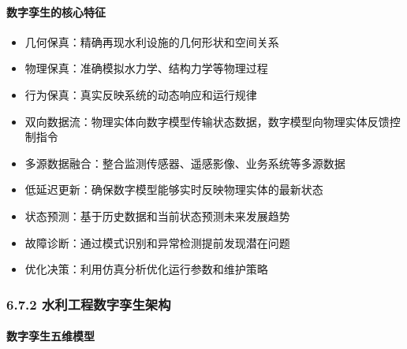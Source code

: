 \hypertarget{ux6570ux5b57ux5b6aux751fux7684ux6838ux5fc3ux7279ux5f81}{%
\paragraph{数字孪生的核心特征}\label{ux6570ux5b57ux5b6aux751fux7684ux6838ux5fc3ux7279ux5f81}}


\begin{itemize}
\tightlist
\item
  几何保真：精确再现水利设施的几何形状和空间关系
\item
  物理保真：准确模拟水力学、结构力学等物理过程
\item
  行为保真：真实反映系统的动态响应和运行规律
\end{itemize}


\begin{itemize}
\tightlist
\item
  双向数据流：物理实体向数字模型传输状态数据，数字模型向物理实体反馈控制指令
\item
  多源数据融合：整合监测传感器、遥感影像、业务系统等多源数据
\item
  低延迟更新：确保数字模型能够实时反映物理实体的最新状态
\end{itemize}


\begin{itemize}
\tightlist
\item
  状态预测：基于历史数据和当前状态预测未来发展趋势
\item
  故障诊断：通过模式识别和异常检测提前发现潜在问题
\item
  优化决策：利用仿真分析优化运行参数和维护策略
\end{itemize}

\hypertarget{ux6c34ux5229ux5de5ux7a0bux6570ux5b57ux5b6aux751fux67b6ux6784}{%
\subsubsection{6.7.2 水利工程数字孪生架构}\label{ux6c34ux5229ux5de5ux7a0bux6570ux5b57ux5b6aux751fux67b6ux6784}}

\hypertarget{ux6570ux5b57ux5b6aux751fux4e94ux7ef4ux6a21ux578b}{%
\paragraph{数字孪生五维模型}\label{ux6570ux5b57ux5b6aux751fux4e94ux7ef4ux6a21ux578b}}

